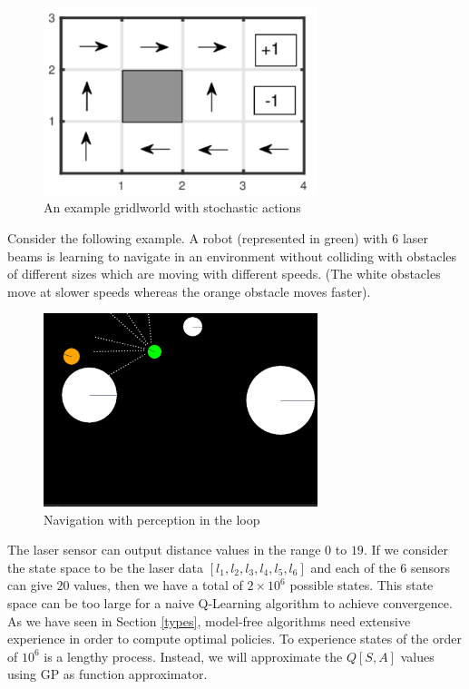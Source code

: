 \documentclass[12pt]{report}
\begin{document}
\begin{figure}[htp]
	\centering
	\includegraphics[width=8cm]{gridworld.pdf}
	\caption{An example gridlworld with stochastic actions}
   \label{fig:gridworld_ex}
\end{figure}

Consider the following example. A robot (represented in green) with $6$ laser beams is learning to navigate in an environment without colliding with obstacles of different sizes which are moving with different speeds. (The white obstacles move at slower speeds whereas the orange obstacle moves faster).
\begin{figure}[htp]
	\centering
	\includegraphics[width=8cm]{gp_laser.pdf}
	\caption{Navigation with perception in the loop}
   \label{fig:gp_laser}
\end{figure}
The laser sensor can output distance values in the range $0$ to $19$. If we consider the state space to be the laser data $[l_1,l_2,l_3,l_4,l_5,l_6]$ and each of the $6$ sensors can give $20$ values, then we have a total of $2 \times 10^6$ possible states. This state space can be too large for a naive Q-Learning algorithm to achieve convergence. As we have seen in Section \ref{types}, model-free algorithms need extensive experience in order to compute optimal policies. To experience states of the order of $10^6$ is a lengthy process. Instead, we will approximate the  $Q[S,A]$ values using GP as function approximator.
\end{document}
